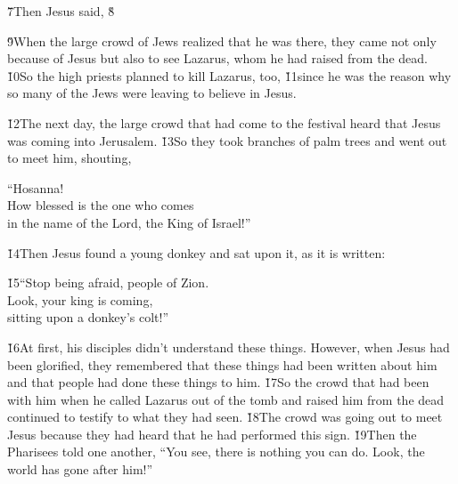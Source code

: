 \v{7}Then Jesus said,  \v{8}

\v{9}When the large crowd of Jews realized that he was there, they came not only because of Jesus but also to see Lazarus, whom he had raised from the dead. \v{10}So the high priests planned to kill Lazarus, too, \v{11}since he was the reason why so many of the Jews were leaving to believe in Jesus.

\v{12}The next day, the large crowd that had come to the festival heard that Jesus was coming into Jerusalem. \v{13}So they took branches of palm trees and went out to meet him, shouting,

\begin{poetry}
\poeml ``Hosanna! \\
\poeml How blessed is the one who comes \\
\poemll    in the name of the Lord, the King of Israel!''
\end{poetry}

\v{14}Then Jesus found a young donkey and sat upon it, as it is written:

\begin{poetry}
\poeml \v{15}``Stop being afraid, people of Zion. \\
\poeml Look, your king is coming, \\
\poemll    sitting upon a donkey's colt!''
\end{poetry}

\v{16}At first, his disciples didn't understand these things. However, when Jesus had been glorified, they remembered that these things had been written about him and that people had done these things to him. \v{17}So the crowd that had been with him when he called Lazarus out of the tomb and raised him from the dead continued to testify to what they had seen. \v{18}The crowd was going out to meet Jesus because they had heard that he had performed this sign. \v{19}Then the Pharisees told one another, ``You see, there is nothing you can do. Look, the world has gone after him!''

